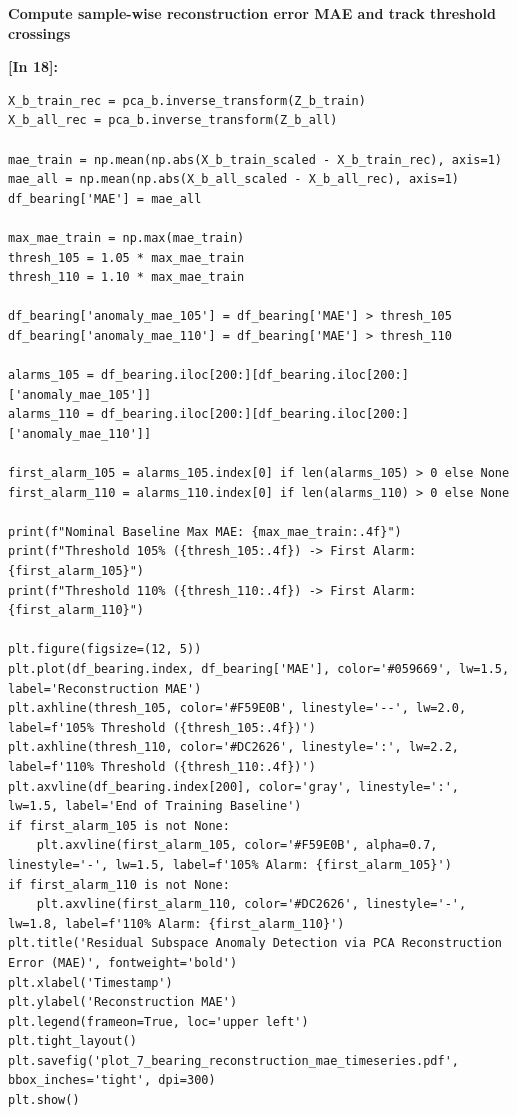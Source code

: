 \vspace{0.2em}
\vspace{0.3em}
\begin{tcolorbox}[colback=gray!5!white,colframe=gray!50!black,boxrule=0.5pt,arc=2pt,left=5pt,right=5pt,top=2pt,bottom=2pt,unbreakable,before upper={\sloppy\raggedright}]
{\small\bfseries Compute sample-wise reconstruction error MAE and track threshold crossings\par}
\end{tcolorbox}
\vspace{0.2em}
\vspace{0.4em}
\noindent\textbf{\small [In 18]:}
\begin{lstlisting}[style=pycode]
X_b_train_rec = pca_b.inverse_transform(Z_b_train)
X_b_all_rec = pca_b.inverse_transform(Z_b_all)

mae_train = np.mean(np.abs(X_b_train_scaled - X_b_train_rec), axis=1)
mae_all = np.mean(np.abs(X_b_all_scaled - X_b_all_rec), axis=1)
df_bearing['MAE'] = mae_all

max_mae_train = np.max(mae_train)
thresh_105 = 1.05 * max_mae_train
thresh_110 = 1.10 * max_mae_train

df_bearing['anomaly_mae_105'] = df_bearing['MAE'] > thresh_105
df_bearing['anomaly_mae_110'] = df_bearing['MAE'] > thresh_110

alarms_105 = df_bearing.iloc[200:][df_bearing.iloc[200:]['anomaly_mae_105']]
alarms_110 = df_bearing.iloc[200:][df_bearing.iloc[200:]['anomaly_mae_110']]

first_alarm_105 = alarms_105.index[0] if len(alarms_105) > 0 else None
first_alarm_110 = alarms_110.index[0] if len(alarms_110) > 0 else None

print(f"Nominal Baseline Max MAE: {max_mae_train:.4f}")
print(f"Threshold 105% ({thresh_105:.4f}) -> First Alarm: {first_alarm_105}")
print(f"Threshold 110% ({thresh_110:.4f}) -> First Alarm: {first_alarm_110}")

plt.figure(figsize=(12, 5))
plt.plot(df_bearing.index, df_bearing['MAE'], color='#059669', lw=1.5, label='Reconstruction MAE')
plt.axhline(thresh_105, color='#F59E0B', linestyle='--', lw=2.0, label=f'105% Threshold ({thresh_105:.4f})')
plt.axhline(thresh_110, color='#DC2626', linestyle=':', lw=2.2, label=f'110% Threshold ({thresh_110:.4f})')
plt.axvline(df_bearing.index[200], color='gray', linestyle=':', lw=1.5, label='End of Training Baseline')
if first_alarm_105 is not None:
    plt.axvline(first_alarm_105, color='#F59E0B', alpha=0.7, linestyle='-', lw=1.5, label=f'105% Alarm: {first_alarm_105}')
if first_alarm_110 is not None:
    plt.axvline(first_alarm_110, color='#DC2626', linestyle='-', lw=1.8, label=f'110% Alarm: {first_alarm_110}')
plt.title('Residual Subspace Anomaly Detection via PCA Reconstruction Error (MAE)', fontweight='bold')
plt.xlabel('Timestamp')
plt.ylabel('Reconstruction MAE')
plt.legend(frameon=True, loc='upper left')
plt.tight_layout()
plt.savefig('plot_7_bearing_reconstruction_mae_timeseries.pdf', bbox_inches='tight', dpi=300)
plt.show()
\end{lstlisting}
